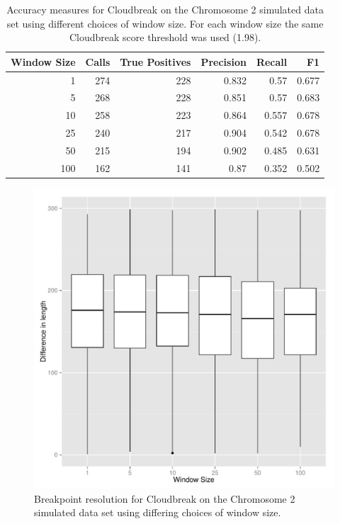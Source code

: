 \begin{table}
\begin{center}
\begin{tabular}{r|rrrrr}
 \hline
 Window Size & Calls & True Positives & Precision & Recall & F1 \\ 
 \hline
   1 & 274 & 228 & 0.832 & 0.57 & 0.677 \\ 
   5 & 268 & 228 & 0.851 & 0.57 & 0.683 \\ 
   10 & 258 & 223 & 0.864 & 0.557 & 0.678 \\ 
   25 & 240 & 217 & 0.904 & 0.542 & 0.678 \\ 
   50 & 215 & 194 & 0.902 & 0.485 & 0.631 \\ 
   100 & 162 & 141 & 0.87 & 0.352 & 0.502 \\  
\end{tabular}
\end{center}
\caption{Accuracy measures for Cloudbreak on the Chromosome 2 simulated data set using different choices of window size. For each window size the same Cloudbreak score threshold was used (1.98).}
\label{chr2AccuracyByWindowSize}
\end{table}
\begin{figure}
\centering
\includegraphics[width=.8\textwidth]{figures/breakpoint_resolution_by_windowSize.pdf}
\caption{Breakpoint resolution for Cloudbreak on the Chromosome 2 simulated data set using differing choices of window size.}
\label{breakpoint_resolution_by_windowSize}
\end{figure}

